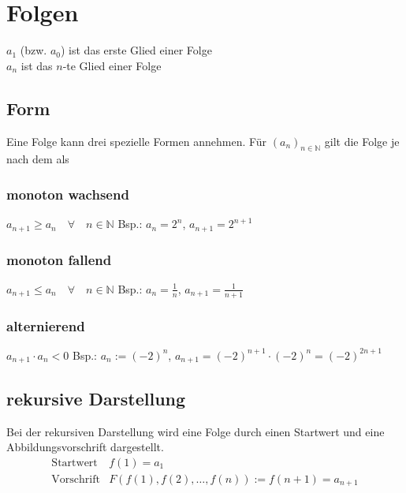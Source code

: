 




\section{Folgen}
$a_1$ (bzw. $a_0$) ist das erste Glied einer Folge\\
$a_n$ ist das $n$-te Glied einer Folge

\subsection{Form}
Eine Folge kann drei spezielle Formen annehmen. Für $(a_n)_{n \in \mathbb{N}}$ gilt die Folge je
nach dem als
\subsubsection*{monoton wachsend}
$ \boxed{ a_{n+1} \geq a_n \quad \forall \quad n \in \mathbb{N} } $ Bsp.: $a_n = 2^n$, $a_{n+1} = 2^{n+1}$
\subsubsection*{monoton fallend}
$ \boxed{ a_{n+1} \leq a_n \quad \forall \quad n \in \mathbb{N} } $ Bsp.: $a_n = \frac{1}{n}$, $a_{n+1} = \frac{1}{n+1}$
\subsubsection*{alternierend}
$ \boxed{ a_{n+1} \cdot a_n < 0 } $ Bsp.: $a_n := (-2)^n$, $a_{n+1} = (-2)^{n+1} \cdot (-2)^n = (-2)^{2n+1}$

\subsection{rekursive Darstellung}
Bei der rekursiven Darstellung wird eine Folge durch einen Startwert und eine Abbildungsvorschrift dargestellt. \\
\[ \boxed{ \begin{matrix}
\text{Startwert} & f(1) = a_1 \\
\text{Vorschrift} & F(f(1), f(2), \ldots, f(n)) := f(n + 1) = a_{n + 1}
\end{matrix}} \]

